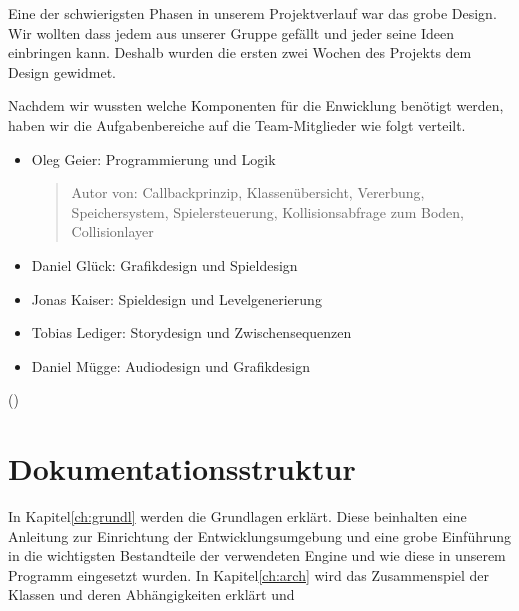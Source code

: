 Eine der schwierigsten Phasen in unserem Projektverlauf war das grobe Design. Wir wollten dass  \gamename jedem aus unserer Gruppe gefällt und jeder seine Ideen einbringen kann. Deshalb wurden die ersten zwei Wochen des Projekts dem Design gewidmet. 

Nachdem wir wussten welche Komponenten für die Enwicklung benötigt werden, haben wir die Aufgabenbereiche auf die Team-Mitglieder wie folgt verteilt.

\begin{itemize}

\item Oleg Geier: Programmierung und Logik
\begin{quote}
Autor von: Callbackprinzip, Klassenübersicht, Vererbung, Speichersystem, Spielersteuerung, Kollisionsabfrage zum Boden, Collisionlayer
\end{quote}

\item Daniel Glück: Grafikdesign und Spieldesign

\item Jonas Kaiser: Spieldesign und Levelgenerierung

\item Tobias Lediger: Storydesign und Zwischensequenzen

\item Daniel Mügge: Audiodesign und Grafikdesign
	
\end{itemize}


()



\section{Dokumentationsstruktur}
In Kapitel\ref{ch:grundl} werden die Grundlagen erklärt. Diese beinhalten eine Anleitung zur Einrichtung der Entwicklungsumgebung und eine grobe Einführung in die wichtigsten Bestandteile 
der verwendeten Engine und wie diese in unserem Programm eingesetzt wurden. 
In Kapitel\ref{ch:arch} wird das Zusammenspiel der Klassen und deren Abhängigkeiten erklärt und 


